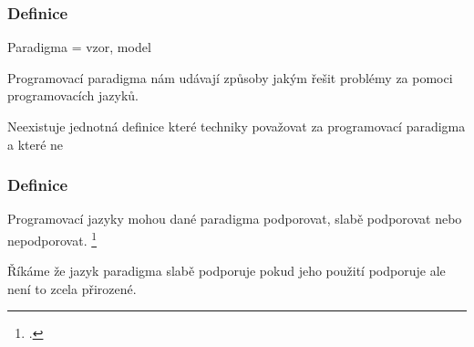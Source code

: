 

\begin{frame}
    \frametitle{Definice}
    Paradigma = vzor, model

    Programovací paradigma nám udávají způsoby jakým řešit problémy za pomoci programovacích jazyků.

    Neexistuje jednotná definice které techniky považovat za programovací paradigma a které ne
\end{frame}


\begin{frame}
    \frametitle{Definice}
    Programovací jazyky mohou dané paradigma podporovat, slabě podporovat nebo nepodporovat. \footcite{paradigms_of_programming}
    
    Říkáme že jazyk paradigma slabě podporuje pokud jeho použití podporuje ale není to zcela přirozené.
\end{frame}
